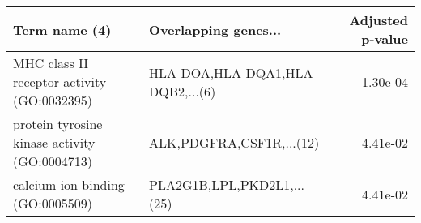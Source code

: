 \begin{tabular}{llr}
\toprule
                                Term name (4) &             Overlapping genes... &  Adjusted p-value \\
\midrule
  MHC class II receptor activity (GO:0032395) & HLA-DOA,HLA-DQA1,HLA-DQB2,...(6) &          1.30e-04 \\
protein tyrosine kinase activity (GO:0004713) &         ALK,PDGFRA,CSF1R,...(12) &          4.41e-02 \\
             calcium ion binding (GO:0005509) &       PLA2G1B,LPL,PKD2L1,...(25) &          4.41e-02 \\
\bottomrule
\end{tabular}
